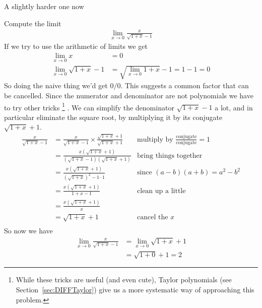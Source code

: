 A slightly harder one now
\begin{eg}\label{eg zero cancel limit harder}
Compute the limit
  \begin{align*}
  \lim_{x \to 0} \frac{x}{\sqrt{1+x}-1}
  \end{align*}
If we try to use the arithmetic of limits we get
\begin{align*}
  \lim_{x \to 0} x &= 0 \\
  \lim_{x \to 0} \sqrt{1+x}-1 &= \sqrt{ \lim_{x \to 0} 1+x}-1 = 1-1 =0
\end{align*}
So doing the naive thing we'd get $0/0$. This suggests a common factor that can
be cancelled. Since the numerator and denominator are not polynomials we have
to try other tricks%
\footnote{While these tricks are useful (and even cute\protect\footnotemark),
Taylor polynomials (see Section~\ref{sec:DIFFTaylor}) give us a more systematic
way of approaching this problem.}%
%
%
. We can simplify the denominator $\sqrt{1+x}-1$ a
lot, and in particular eliminate the square root, by multiplying it by
its conjugate $\sqrt{1+x}+1$.
\begin{align*}
  \frac{x}{\sqrt{1+x}-1}
  &=\frac{x}{\sqrt{1+x}-1} \times \frac{\sqrt{1+x}+1}{\sqrt{1+x}+1}
  & \text{multiply by $\frac{\text{conjugate}}{\text{conjugate}}=1$} \\
    &=\frac{x \left( \sqrt{1+x}+1\right)}
  {\left(\sqrt{1+x}-1\right)\left(\sqrt{1+x}+1\right)}
  & \text{bring things together } \\
    &=\frac{x \left( \sqrt{1+x}+1\right)}
  {\left(\sqrt{1+x}\right)^2 - 1\cdot 1}
  & \text{since $(a-b)(a+b)=a^2-b^2$} \\
    &=\frac{x \left( \sqrt{1+x}+1\right)}
  {1+x - 1}
  & \text{clean up a little} \\
    &=\frac{x \left( \sqrt{1+x}+1\right)}{x} \\
  &= \sqrt{1+x}+1
  & \text{cancel the $x$} \\
\end{align*}
So now we have
  \begin{align*}
  \lim_{x \to 0} \frac{x}{\sqrt{1+x}-1}
  &= \lim_{x \to 0} \sqrt{1+x}+1 \\
  &= \sqrt{1+0}+1 = 2
  \end{align*}
\end{eg}
